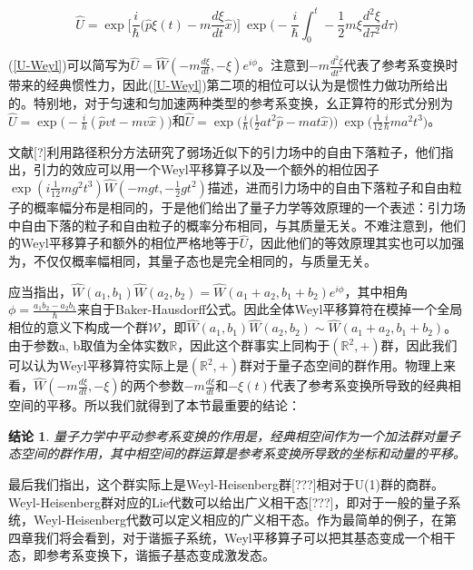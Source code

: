 \documentclass[a4paper]{article}
\newtheorem*{conclusion}{结论}
\begin{document}
        \begin{equation}\label{U-Weyl}
            \hat{U} = \exp\bigg[\frac{i}{\hbar}\bigg(\hat{p}\xi(t)-m\frac{d\xi}{dt}\hat{x} \bigg) \bigg]\ \exp\bigg( -\frac{i}{\hbar}\int_0^t-\frac{1}{2}m\xi\frac{d^2\xi}{d\tau^2} d\tau\bigg)
        \end{equation}

        (\ref{U-Weyl})可以简写为$\hat{U}=\hat{W}(-m\frac{d\xi}{dt},-\xi)e^{i\phi}$。注意到$-m\frac{d^2\xi}{dt^2}$代表了参考系变换时带来的经典惯性力，因此(\ref{U-Weyl})第二项的相位可以认为是惯性力做功所给出的。特别地，对于匀速和匀加速两种类型的参考系变换，幺正算符的形式分别为$\hat{U}=\exp\big(-\frac{i}{h}(\hat{p}vt-mv\hat{x})\big)$和$\hat{U}=\exp\big(\frac{i}{\hbar}\big(\frac{1}{2}at^2\hat{p}-mat\hat{x} \big)\big)\ \exp\big(\frac{1}{12}\frac{i}{\hbar}ma^2t^3\big)$。
        
        文献[?]利用路径积分方法研究了弱场近似下的引力场中的自由下落粒子，他们指出，引力的效应可以用一个Weyl平移算子以及一个额外的相位因子$\exp(i\frac{1}{12}mg^2t^3)\hat{W}(-mgt,-\frac{1}{2}gt^2)$描述，进而引力场中的自由下落粒子和自由粒子的概率幅分布是相同的，于是他们给出了量子力学等效原理的一个表述：引力场中自由下落的粒子和自由粒子的概率分布相同，与其质量无关。不难注意到，他们的Weyl平移算子和额外的相位严格地等于$\hat{U}$，因此他们的等效原理其实也可以加强为，不仅仅概率幅相同，其量子态也是完全相同的，与质量无关。

        应当指出，$\hat{W}(a_1, b_1)\hat{W}(a_2, b_2)=\hat{W}(a_1+a_2, b_1+b_2)e^{i\phi}$，其中相角$\phi=\frac{a_1b_2-a_2b_1}{\hbar}$来自于Baker-Hausdorff公式。因此全体Weyl平移算符在模掉一个全局相位的意义下构成一个群$\mathcal{W}$，即$\hat{W}(a_1, b_1)\hat{W}(a_2, b_2)\sim\hat{W}(a_1+a_2, b_1+b_2)$。由于参数a, b取值为全体实数$\mathbb{R}$，因此这个群事实上同构于$(\mathbb{R}^2,+)$群，因此我们可以认为Weyl平移算符实际上是$(\mathbb{R}^2,+)$群对于量子态空间的群作用。物理上来看，$\hat{W}(-m\frac{d\xi}{dt}, -\xi)$的两个参数$-m\frac{d\xi}{dt}$和$-\xi(t)$代表了参考系变换所导致的经典相空间的平移。所以我们就得到了本节最重要的结论：

        \begin{conclusion}
            量子力学中平动参考系变换的作用是，经典相空间作为一个加法群对量子态空间的群作用，其中相空间的群运算是参考系变换所导致的坐标和动量的平移。
        \end{conclusion}
    
        最后我们指出，这个群实际上是Weyl-Heisenberg群[???]相对于U(1)群的商群。Weyl-Heisenberg群对应的Lie代数可以给出广义相干态[???]，即对于一般的量子系统，Weyl-Heisenberg代数可以定义相应的广义相干态。作为最简单的例子，在第四章我们将会看到，对于谐振子系统，Weyl平移算子可以把其基态变成一个相干态，即参考系变换下，谐振子基态变成激发态。
\end{document}
